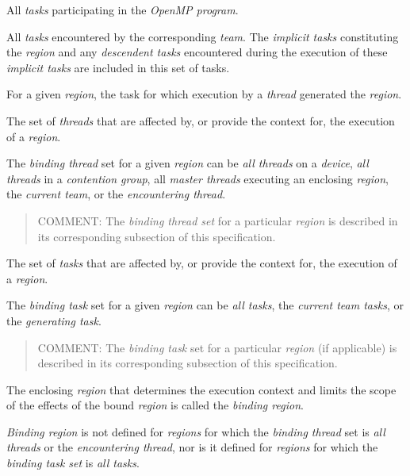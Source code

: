 \glossarydefstart
All \emph{tasks} participating in the \emph{OpenMP program}. 
\glossarydefend

\glossarydefstart
All \emph{tasks} encountered by the corresponding \emph{team}. The \emph{implicit tasks}
constituting the  \emph{region} and any \emph{descendent tasks} encountered during 
the execution of these \emph{implicit tasks} are included in this set of tasks. 
\glossarydefend

\glossarydefstart
For a given \emph{region}, the task for which execution by a \emph{thread} generated the \emph{region}.
\glossarydefend

\glossarydefstart
The set of \emph{threads} that are affected by, or provide the context for, the execution of 
a \emph{region}. 

The \emph{binding thread} set for a given \emph{region} can be \emph{all threads} on a \emph{device}, \emph{all 
threads} in a \emph{contention group}, all \emph{master threads} executing an
enclosing  \emph{region}, the \emph{current team}, or the \emph{encountering thread}.

\begin{quote}
COMMENT: The \emph{binding thread set} for a particular \emph{region} is described in its 
corresponding subsection of this specification.
\end{quote}
\glossarydefend

\glossarydefstart
The set of \emph{tasks} that are affected by, or provide the context for, the execution of a 
\emph{region}. 

The \emph{binding task} set for a given \emph{region} can be \emph{all tasks}, 
the \emph{current team tasks}, or the \emph{generating task}. 

\begin{quote}
COMMENT: The \emph{binding task} set for a particular \emph{region} (if applicable) is 
described in its corresponding subsection of this specification.
\end{quote}
\glossarydefend

\pagebreak
{}
\glossarydefstart
The enclosing \emph{region} that determines the execution context and limits the scope of 
the effects of the bound \emph{region} is called the \emph{binding region}.

\emph{Binding region} is not defined for \emph{regions} for which the \emph{binding thread} set is \emph{all threads}
or the \emph{encountering thread}, nor is it defined for \emph{regions} for which the \emph{binding task set} is 
\emph{all tasks}.


